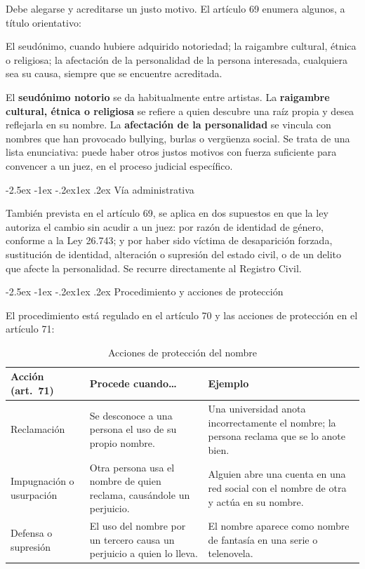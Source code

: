 \documentclass[12pt,oneside]{book}
\makeatletter
\renewcommand\subsection{\@startsection{subsection}{2}{\z@}%
  {-2.5ex \@plus -1ex \@minus -.2ex}{1ex \@plus .2ex}%
  {\normalfont\normalsize\bfseries}}
\makeatother
\begin{document}
Debe alegarse y acreditarse un justo motivo. El artículo 69 enumera algunos, a título orientativo:

\begin{regla}
El seudónimo, cuando hubiere adquirido notoriedad; la raigambre cultural, étnica o religiosa; la afectación de la personalidad de la persona interesada, cualquiera sea su causa, siempre que se encuentre acreditada.
\end{regla}

El \textbf{seudónimo notorio} se da habitualmente entre artistas. La \textbf{raigambre cultural, étnica o religiosa} se refiere a quien descubre una raíz propia y desea reflejarla en su nombre. La \textbf{afectación de la personalidad} se vincula con nombres que han provocado bullying, burlas o vergüenza social. Se trata de una lista enunciativa: puede haber otros justos motivos con fuerza suficiente para convencer a un juez, en el proceso judicial específico.

\subsection{Vía administrativa}

También prevista en el artículo 69, se aplica en dos supuestos en que la ley autoriza el cambio sin acudir a un juez: por razón de identidad de género, conforme a la Ley 26.743; y por haber sido víctima de desaparición forzada, sustitución de identidad, alteración o supresión del estado civil, o de un delito que afecte la personalidad. Se recurre directamente al Registro Civil.

\subsection{Procedimiento y acciones de protección}

El procedimiento está regulado en el artículo 70 y las acciones de protección en el artículo 71:

\begin{table}[H]
\centering
\begin{tabularx}{\textwidth}{B{0.26\textwidth} Y Y}
\toprule
\textbf{Acción (art.~71)} & \textbf{Procede cuando\ldots} & \textbf{Ejemplo} \\
\midrule
Reclamación & Se desconoce a una persona el uso de su propio nombre. & Una universidad anota incorrectamente el nombre; la persona reclama que se lo anote bien. \\
Impugnación o usurpación & Otra persona usa el nombre de quien reclama, causándole un perjuicio. & Alguien abre una cuenta en una red social con el nombre de otra y actúa en su nombre. \\
Defensa o supresión & El uso del nombre por un tercero causa un perjuicio a quien lo lleva. & El nombre aparece como nombre de fantasía en una serie o telenovela. \\
\bottomrule
\end{tabularx}
\caption{Acciones de protección del nombre}
\end{table}
\end{document}
